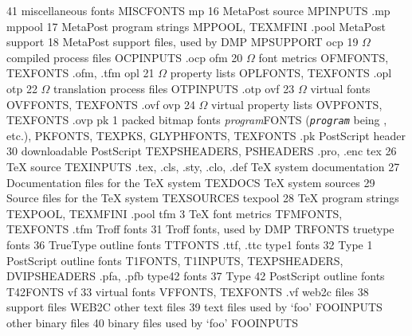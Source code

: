 \documentclass{article}
\def\OMEGA{$\Omega$}
\begin{document}
\begin{small}
\begin{longtable}
 {}
 {41}
 {miscellaneous fonts}
 {MISCFONTS}
 {}
\KpathKey
 {mp}
 {16}
 {MetaPost source}
 {MPINPUTS}
 {.mp}
\KpathKey
 {mppool}
 {17}
 {MetaPost program strings}
 {MPPOOL, TEXMFINI}
 {.pool}
\KpathKey
 {MetaPost support}
 {18}
 {MetaPost support files, used by DMP}
 {MPSUPPORT}
 {}
\KpathKey
 {ocp}
 {19}
 {\OMEGA{} compiled process files}
 {OCPINPUTS}
 {.ocp}
\KpathKey
 {ofm}
 {20}
 {\OMEGA{} font metrics}
 {OFMFONTS, TEXFONTS}
 {.ofm, .tfm}
\KpathKey
 {opl}
 {21}
 {\OMEGA{} property lists}
 {OPLFONTS, TEXFONTS}
 {.opl}
\KpathKey
 {otp}
 {22}
 {\OMEGA{} translation process files}
 {OTPINPUTS}
 {.otp}
\KpathKey
 {ovf}
 {23}
 {\OMEGA{} virtual fonts}
 {OVFFONTS, TEXFONTS}
 {.ovf}
\KpathKey
 {ovp}
 {24}
 {\OMEGA{} virtual property lists}
 {OVPFONTS, TEXFONTS}
 {.ovp}
\KpathKey
 {pk}
 {1}
 {packed bitmap fonts}
 {\emph{program}FONTS \textrm{(\texttt{\emph{program}} being
     ,
     etc.)}, PKFONTS, TEXPKS, GLYPHFONTS, TEXFONTS}
 {.pk}
\KpathKey
 {PostScript header}
 {30}
 {downloadable PostScript}
 {TEXPSHEADERS, PSHEADERS}
 {.pro, .enc}
\KpathKey
 {tex}
 {26}
 {\TeX{} source}
 {TEXINPUTS}
 {.tex, .cls, .sty, .clo, .def}
\KpathKey
 {TeX system documentation}
 {27}
 {Documentation files for the \TeX{} system}
 {TEXDOCS}
 {}
\KpathKey
 {TeX system sources}
 {29}
 {Source files for the \TeX{} system}
 {TEXSOURCES}
 {}
\KpathKey
 {texpool}
 {28}
 {\TeX{} program strings}
 {TEXPOOL, TEXMFINI}
 {.pool}
\KpathKey
 {tfm}
 {3}
 {\TeX{} font metrics}
 {TFMFONTS, TEXFONTS}
 {.tfm}
\KpathKey
 {Troff fonts}
 {31}
 {Troff fonts, used by DMP}
 {TRFONTS}
 {}
\KpathKey
 {truetype fonts}
 {36}
 {TrueType outline fonts}
 {TTFONTS}
 {.ttf, .ttc}
\KpathKey
 {type1 fonts}
 {32}
 {Type 1 PostScript outline fonts}
 {T1FONTS, T1INPUTS, TEXPSHEADERS, DVIPSHEADERS}
 {.pfa, .pfb}
\KpathKey
 {type42 fonts}
 {37}
 {Type 42 PostScript outline fonts}
 {T42FONTS}
 {}
\KpathKey
 {vf}
 {33}
 {virtual fonts}
 {VFFONTS, TEXFONTS}
 {.vf}
\KpathKey
 {web2c files}
 {38}
 {\Webc{} support files}
 {WEB2C}
 {}
\KpathKey
 {other text files}
 {39}
 {text files used by `\textsf{foo}'}
 {FOOINPUTS}
 {}
\KpathKey
 {other binary files}
 {40}
 {binary files used by `\textsf{foo}'}
 {FOOINPUTS}
 {}
\end{longtable}
\end{small}
\end{document}
